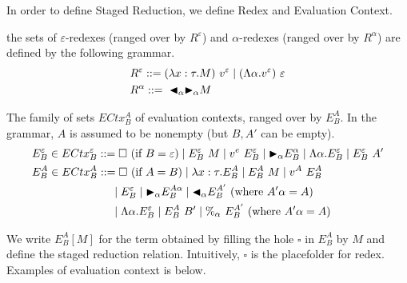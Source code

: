 In order to define Staged Reduction, we define Redex and Evaluation Context.

\begin{definition}[Redex]
	the sets of $\varepsilon$-redexes (ranged over by $R^\varepsilon$) and $\alpha$-redexes (ranged over by $R^\alpha$) are defined by the following grammar.
	\begin{align*}
		 & R^\varepsilon ::= (\lambda x:\tau.M)\ v^\varepsilon \mid (\Lambda\alpha.v^\varepsilon)\ \varepsilon \\
		 & R^\alpha      ::=\ {\mathop{\blacktriangleleft}}_\alpha {\mathop{\blacktriangleright}}_\alpha M                                                         \\
	\end{align*}
\end{definition}

\begin{definition}
	The family of sets $ECtx^A_B$ of evaluation contexts, ranged over by $E^A_B$.
	In the grammar, $A$ is assumed to be nonempty (but $B,A'$ can be empty).
	\begin{align*}
		 & E^\varepsilon_B \in ECtx^\varepsilon_B ::= \square\ (\text{if\ } B = \varepsilon)
		\mid E^\varepsilon_B\ M \mid v^e\ E^\varepsilon_B \mid \TB_\alpha E^\alpha_B
		\mid \Lambda\alpha.E^\varepsilon_B \mid E^\varepsilon_B\ A'                                                                       \\
		 & E^A_B \in ECtx^A_B                     ::= \square\ (\text{if } A = B) \mid \lambda x:\tau.E^A_B \mid E^A_B\ M \mid v^A\ E^A_B \\
		 & \hspace{25mm} \mid E^\varepsilon_B \mid \TB_\alpha E^{A\alpha}_B \mid \TBL_\alpha E^{A'}_B \ (\text{where } A'\alpha = A)      \\
		 & \hspace{25mm} \mid \Lambda\alpha.E^\varepsilon_B \mid E^A_B\ B' \mid \%_\alpha\ E^{A'}_B \ (\text{where } A'\alpha = A)        \\
	\end{align*}
\end{definition}

We write $E^A_B[M]$ for the term obtained by filling the hole $\square$ in $E^A_B$ by $M$ 
and define the staged reduction relation.
Intuitively, $\square$ is the placefolder for redex.
Examples of evaluation context is below.

